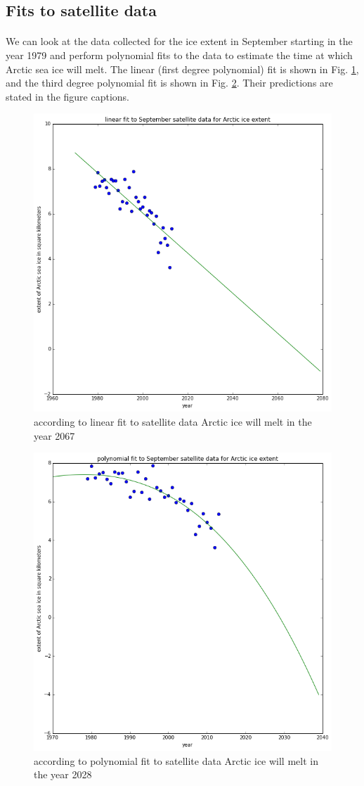 \documentclass[12pt,a4paper]{article} %
\begin{document}
\subsection{Fits to satellite data}
\paragraph{}
We can look at the data collected for the ice extent in September starting in the year 1979 and perform polynomial fits to the data to estimate the time at which Arctic sea ice will melt.  The linear (first degree polynomial) fit is shown in Fig. \ref{linfitsat}, and the  third degree polynomial fit is shown in Fig. \ref{polyFitSat}. Their predictions are stated in the figure captions.

\begin{figure}[hp]
\centering
 \includegraphics[width=0.75\linewidth]{../img/linearFitSat.png}
\caption{according to linear fit to satellite data Arctic ice will melt in the year 2067}
\label{linfitsat}
\end{figure}

\begin{figure}[hp]
\centering
 \includegraphics[width=0.75\linewidth]{../img/polyFitSat.png}
\caption{according to polynomial fit to satellite data Arctic ice will melt in the year 2028}
\label{polyFitSat}
\end{figure}
\end{document}
